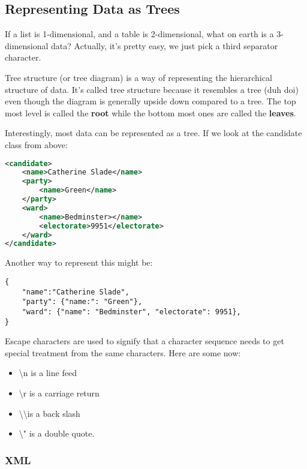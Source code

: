 \documentclass[11pt,a4paper,titlepage,dvipsnames,cmyk]{scrartcl}
\begin{document}
\subsection{Representing Data as Trees}%
\label{sub:tree-data}
If a list is 1-dimensional, and a table is 2-dimensional, what on earth is
a 3-dimensional data? Actually, it's pretty easy, we just pick a third
separator character.

Tree structure (or tree diagram) is a way of representing the hierarchical
structure of data. It's called tree structure because it resembles a tree
(duh doi) even though the diagram is generally upside down compared to a
tree. The top most level is called the \textbf{root} while the bottom most
ones are called the \textbf{leaves}.

\begin{minipage}{\textwidth}
Interestingly, most data can be represented as a tree. If we look at the
candidate class from above:

\begin{lstlisting}[language=XML]
<candidate>
    <name>Catherine Slade</name>
    <party>
        <name>Green</name>
    </party>
    <ward>
        <name>Bedminster></name>
        <electorate>9951</electorate>
    </ward>
</candidate>
\end{lstlisting}
\end{minipage}

Another way to represent this might be:

\begin{lstlisting}[]
{
    "name":"Catherine Slade",
    "party": {"name:": "Green"},
    "ward": {"name": "Bedminster", "electorate": 9951},
}
\end{lstlisting}

Escape characters are used to signify that a character sequence needs to
get special treatment from the same characters. Here are some now:

\begin{itemize}
    \item \textbackslash n is a line feed
    \item \textbackslash r is a carriage return
    \item \textbackslash \textbackslash \text{ }is a back slash
    \item \textbackslash " is a double quote.
\end{itemize}

\subsubsection{XML}%
\label{ssub:XML}
\end{document}
